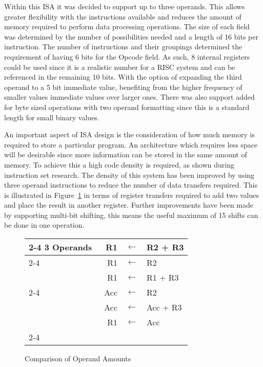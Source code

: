 Within this ISA it was decided to support up to three operands. 
This allows greater flexibility with the instructions available and reduces the amount of memory required to perform data processing operations. 
The size of each field was determined by the number of possibilities needed and a length of 16 bits per instruction.
The number of instructions and their groupings determined the requirement of having 6 bits for the Opcode field. 
As such, 8 internal registers could be used since it is a realistic number for a RISC system and can be referenced in the remaining 10 bits. 
With the option of expanding the third operand to a 5 bit immediate value, benefiting from the higher frequency of smaller values immediate values over larger ones. 
There was also support added for byte sized operations with two operand formatting since this is a standard length for small binary values. 

An important aspect of ISA design is the consideration of how much memory is required to store a particular program. 
An architecture which requires less space will be desirable since more information can be stored in the same amount of memory. 
To achieve this a high code density is required, as shown during instruction set research.
The density of this system has been improved by using three operand instructions to reduce the number of data transfers required. 
This is illustrated in Figure~\ref{fig:NoOperands} in terms of register transfers required to add two values and place the result in another register. 
Further improvements have been made by supporting multi-bit shifting, this means the useful maximum of 15 shifts can be done in one operation.

\begin{figure}[h]
\setlength{\tabcolsep}{2pt}
\centering
\footnotesize
\begin{tabular}{l|rcl|}
	\cline{2-4}
	3 Operands & R1 & $\leftarrow$ & R2 + R3 \\
	\cline{2-4}
	\multirow{2}{*}{2 Operands} & R1 & $\leftarrow$ & R2 \\
	 & R1 & $\leftarrow$ & R1 + R3 \\
	\cline{2-4}
	\multirow{3}{*}{1 Operand} & Acc & $\leftarrow$ & R2 \\
	 & ~Acc & $\leftarrow$ & Acc + R3 \hspace{0.5cm} \\
	 & R1 & $\leftarrow$ & Acc \\
	\cline{2-4}
\end{tabular}
\caption{Comparison of Operand Amounts}
\label{fig:NoOperands}
\end{figure}

